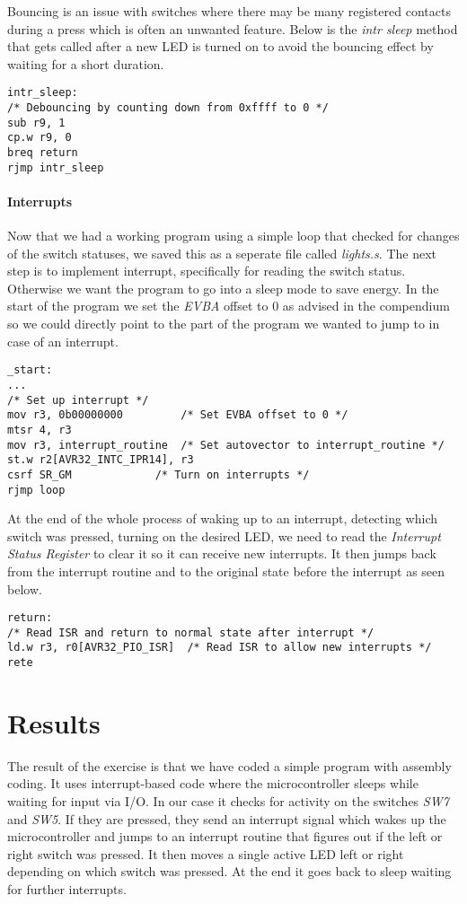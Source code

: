 \documentclass[a4paper,11pt]{article}
\begin{document}
Bouncing is an issue with switches where there may be many registered contacts during a press which is often an unwanted feature. Below is the \emph{intr sleep} method that gets called after a new LED is turned on to avoid the bouncing effect by waiting for a short duration.

\begin{lstlisting}
intr_sleep:				
/* Debouncing by counting down from 0xffff to 0 */
sub r9, 1
cp.w r9, 0
breq return
rjmp intr_sleep
\end{lstlisting}

\paragraph{Interrupts}
Now that we had a working program using a simple loop that checked for changes of the switch statuses, we saved this as a seperate file called \emph{lights.s}. The next step is to implement interrupt, specifically for reading the switch status. Otherwise we want the program to go into a sleep mode to save energy. In the start of the program we set the \emph{EVBA} offset to 0 as advised in the compendium so we could directly point to the part of the program we wanted to jump to in case of an interrupt.

\begin{lstlisting}
_start:
...
/* Set up interrupt */
mov r3, 0b00000000  	   /* Set EVBA offset to 0 */
mtsr 4, r3			
mov r3, interrupt_routine  /* Set autovector to interrupt_routine */
st.w r2[AVR32_INTC_IPR14], r3	
csrf SR_GM  		   /* Turn on interrupts */
rjmp loop
\end{lstlisting}

At the end of the whole process of waking up to an interrupt, detecting which switch was pressed, turning on the desired LED, we need to read the \emph{Interrupt Status Register} to clear it so it can receive new interrupts. It then jumps back from the interrupt routine and to the original state before the interrupt as seen below.

\begin{lstlisting}
return:
/* Read ISR and return to normal state after interrupt */
ld.w r3, r0[AVR32_PIO_ISR]	/* Read ISR to allow new interrupts */
rete
\end{lstlisting}

\section{Results}
The result of the exercise is that we have coded a simple program with assembly coding. It uses interrupt-based code where the microcontroller sleeps while waiting for input via I/O. In our case it checks for activity on the switches \emph{SW7} and \emph{SW5}. If they are pressed, they send an interrupt signal which wakes up the microcontroller and jumps to an interrupt routine that figures out if the left or right switch was pressed. It then moves a single active LED left or right depending on which switch was pressed. At the end it goes back to sleep waiting for further interrupts.
\end{document}
